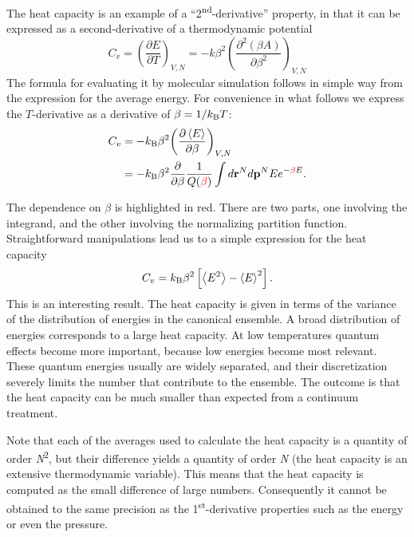 \documentclass[]{article}
\begin{document}
The heat capacity is an example of a
``2\textsuperscript{nd}-derivative'' property, in that it can be
expressed as a second-derivative of a thermodynamic potential
\[{C_v} = {\left( {\frac{{\partial E}}{{\partial T}}} \right)_{V,N}} =  - k{\beta ^2}{\left( {\frac{{{\partial ^2}(\beta A)}}{{\partial {\beta ^2}}}} \right)_{V,N}}\]
The formula for evaluating it by molecular simulation follows in simple
way from the expression for the average energy. For convenience in what
follows we express the $T$-derivative as a derivative of $\beta = 1/k_{\rm B}T$:
\begin{align*}
{C_v} &=  - k_{\rm B}{\beta ^2}{\left( {\frac{{\partial \left\langle E \right\rangle }}{{\partial \beta }}} \right)_{V,N}}\\
 &=  - k_{\rm B}{\beta ^2}\frac{\partial }{{\partial \beta }}\frac{1}{{Q({\color{red} \beta} )}}\int {d{{\bf r}^N}d{{\bf p}^N}} E{e^{ - {\color{red} \beta} E}}.
\end{align*}

The dependence on $\beta$ is highlighted in red. There are two parts, one
involving the integrand, and the other involving the normalizing
partition function. Straightforward manipulations lead us to a simple
expression for the heat capacity
\[{C_v} = k_{\rm B}{\beta ^2}\left[ {\left\langle {{E^2}} \right\rangle  - {{\left\langle E \right\rangle }^2}} \right].\]
This is an interesting result. The heat capacity is given in terms of
the variance of the distribution of energies in the canonical ensemble.
A broad distribution of energies corresponds to a large heat capacity.
At low temperatures quantum effects become more important, because low
energies become most relevant. These quantum energies usually are widely
separated, and their discretization severely limits the number that
contribute to the ensemble. The outcome is that the heat capacity can be
much smaller than expected from a continuum treatment.

Note that each of the averages used to calculate the heat capacity is a
quantity of order \emph{N}\textsuperscript{2}, but their difference
yields a quantity of order \emph{N} (the heat capacity is an extensive
thermodynamic variable). This means that the heat capacity is computed
as the small difference of large numbers. Consequently it cannot be
obtained to the same precision as the 1\textsuperscript{st}-derivative
properties such as the energy or even the pressure.
\end{document}
